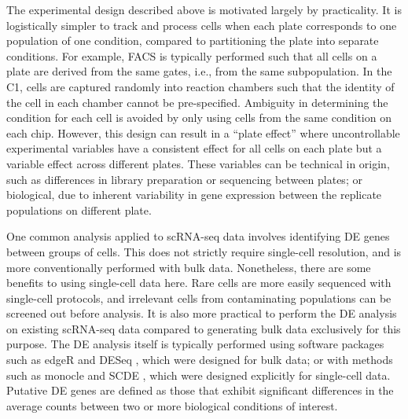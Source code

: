\documentclass{article}
\begin{document}
The experimental design described above is motivated largely by practicality.
It is logistically simpler to track and process cells when each plate corresponds to one population of one condition, compared to partitioning the plate into separate conditions.
For example, FACS is typically performed such that all cells on a plate are derived from the same gates, i.e., from the same subpopulation.
In the C1, cells are captured randomly into reaction chambers such that the identity of the cell in each chamber cannot be pre-specified.
Ambiguity in determining the condition for each cell is avoided by only using cells from the same condition on each chip.
However, this design can result in a ``plate effect'' where uncontrollable experimental variables have a consistent effect for all cells on each plate but a variable effect across different plates. 
These variables can be technical in origin, such as differences in library preparation or sequencing between plates; 
    or biological, due to inherent variability in gene expression between the replicate populations on different plate.

One common analysis applied to scRNA-seq data involves identifying DE genes between groups of cells.
This does not strictly require single-cell resolution, and is more conventionally performed with bulk data.
Nonetheless, there are some benefits to using single-cell data here.
Rare cells are more easily sequenced with single-cell protocols, and irrelevant cells from contaminating populations can be screened out before analysis.
It is also more practical to perform the DE analysis on existing scRNA-seq data compared to generating bulk data exclusively for this purpose.
The DE analysis itself is typically performed using software packages such as edgeR \cite{robinson2010edgeR} and DESeq \cite{anders2010differential}, which were designed for bulk data;
    or with methods such as monocle \cite{trapnell2014dynamics} and SCDE \cite{kharchenko2014bayesian}, which were designed explicitly for single-cell data.
Putative DE genes are defined as those that exhibit significant differences in the average counts between two or more biological conditions of interest.
\end{document}
